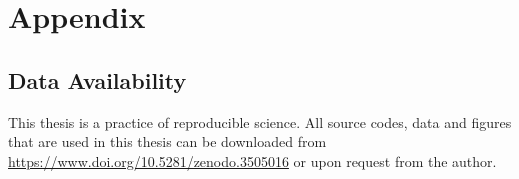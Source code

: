\chapter{Appendix}
\label{ch:appendix}

\def\doiscr{10.5281/zenodo.3505016}
\section*{Data Availability}

This thesis is a practice of reproducible science. All source codes,
data and figures that are used in this thesis can be downloaded from \url{https://www.doi.org/10.5281/zenodo.3505016}
or upon request from the author.

